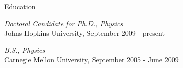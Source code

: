 \newlength{\oldcvlabelwidth}
\newlength{\oldcvlabelsep}

\setlength{\oldcvlabelwidth}{\cvlabelwidth}
\setlength{\oldcvlabelsep}{\cvlabelsep}

\setlength{\cvlabelwidth}{1em}

\begin{cvlist}{Education}
\item \emph {Doctoral Candidate for Ph.D., Physics}\\
  Johns Hopkins University, September  2009 - present  
  
\item \emph{B.S., Physics}\\
Carnegie Mellon University, September 2005 - June 2009
\end{cvlist}

\setlength{\cvlabelwidth}{0em}
\setlength{\cvlabelsep}{\labelsep}

